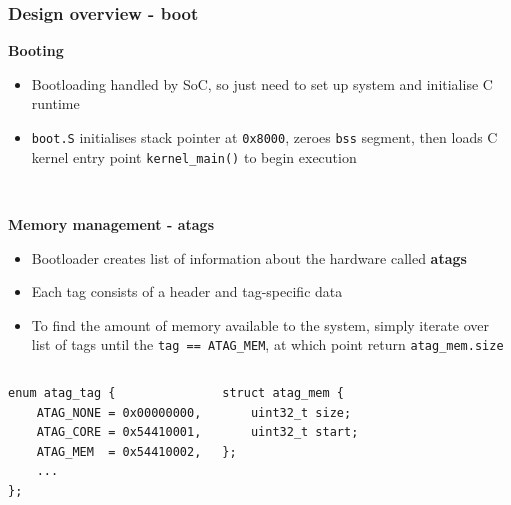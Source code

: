 \documentclass[10pt]{beamer}
\begin{document}
\begin{frame}[fragile]
    \frametitle{Design overview - boot}
    \textbf{Booting}
    \begin{itemize}
        \item Bootloading handled by SoC, so just need to set up system and
            initialise C runtime
        \item \texttt{boot.S} initialises stack pointer at \texttt{0x8000},
            zeroes \texttt{bss} segment, then loads C kernel entry point
            \texttt{kernel\_main()} to begin execution
    \end{itemize} ~

    \textbf{Memory management - atags}
    \begin{itemize}
        \item Bootloader creates list of information about the hardware called
            \textbf{atags}
        \item Each tag consists of a header and tag-specific data
        \item To find the amount of memory available to the system, simply
            iterate over list of tags until the \texttt{tag == ATAG\_MEM}, at
            which point return \texttt{atag\_mem.size}
    \end{itemize}

    \begin{columns}[t]
        \lstset{language=C,basicstyle=\ttfamily}
        \begin{lstlisting}
enum atag_tag {
    ATAG_NONE = 0x00000000,
    ATAG_CORE = 0x54410001,
    ATAG_MEM  = 0x54410002,
    ...
};
        \end{lstlisting}
        \lstset{language=C,basicstyle=\ttfamily}
        \begin{lstlisting}
struct atag_mem {
    uint32_t size;
    uint32_t start;
};
        \end{lstlisting}
    \end{columns}
\end{frame}
\end{document}
